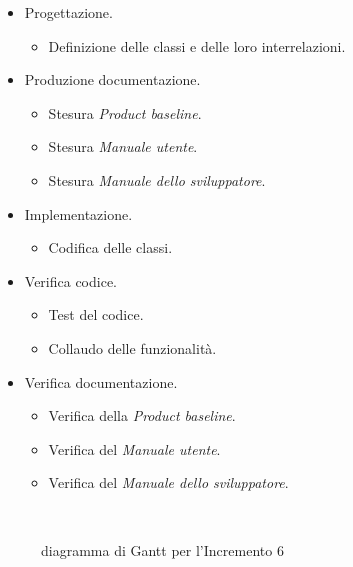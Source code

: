 \documentclass[../piano-di-progetto.tex]{subfiles}
\begin{document}
\begin{itemize}
  \item Progettazione.
  \begin{itemize}
    \item Definizione delle classi e delle loro interrelazioni.
  \end{itemize}
  \item Produzione documentazione.
  \begin{itemize}
    \item Stesura \textit{Product baseline}.
    \item Stesura \textit{Manuale utente}.
    \item Stesura \textit{Manuale dello sviluppatore}.
  \end{itemize}
  \item Implementazione.
  \begin{itemize}
    \item Codifica delle classi.
  \end{itemize}
  \item Verifica codice.
  \begin{itemize}
    \item Test del codice.
    \item Collaudo delle funzionalità.
  \end{itemize}
  \item Verifica documentazione.
  \begin{itemize}
    \item Verifica della \textit{Product baseline}.
    \item Verifica del \textit{Manuale utente}.
    \item Verifica del \textit{Manuale dello sviluppatore}.
  \end{itemize}
\end{itemize}
\begin{figure}[H]
  \centering
  
  \caption{diagramma di Gantt per l'Incremento 6}%
~~\label{fig:gantt_incremento_6}
\end{figure}
\end{document}

